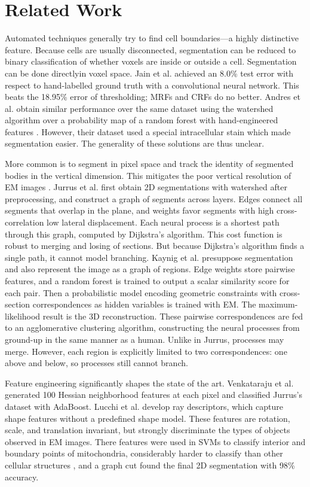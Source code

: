 \documentclass[english]{article}
\newcommand{\+}[1]{\ensuremath{\boldsymbol{\mathrm{#1}}}}
\begin{document}
\section{Related Work}
Automated techniques generally try to find cell boundaries---a highly distinctive feature. Because cells are usually disconnected, segmentation can be reduced to binary classification of whether voxels are inside or outside a cell. Segmentation can be done directlyin voxel space. Jain et al. \cite{Jain2007} achieved an 8.0\% test error with respect to hand-labelled ground truth with a convolutional neural network. This beats the 18.95\% error of thresholding; MRFs and CRFs do no better. Andres et al. obtain similar performance over the same dataset using the watershed algorithm over a probability map of a random forest with hand-engineered features \cite{Andres2008}. However, their dataset used a special intracellular stain which made segmentation easier. The generality of these solutions are thus unclear.

More common is to segment in pixel space and track the identity of segmented bodies in the vertical dimension. This mitigates the poor vertical resolution of EM images \cite{Kaynig2010, Briggman2006}. Jurrus et al. \cite{Jurrus2008} first obtain 2D segmentations with watershed after preprocessing, and construct a graph of segments across layers. Edges connect all segments that overlap in the plane, and weights favor segments with high cross-correlation low lateral displacement. Each neural process is a shortest path through this graph, computed by Dijkstra's algorithm. This cost function is robust to merging and losing of sections. But because Dijkstra's algorithm finds a single path, it cannot model branching. Kaynig et al. \cite{Kaynig2010a} presuppose segmentation and also represent the image as a graph of regions. Edge weights store pairwise features, and a random forest is trained to output a scalar similarity score for each pair. Then a probabilistic model encoding geometric constraints with cross-section correspondences as hidden variables is trained with EM. The maximum-likelihood result is the 3D reconstruction. These pairwise correspondences are fed to an agglomerative clustering algorithm, constructing the neural processes from ground-up in the same manner as a human. Unlike in Jurrus, processes may merge. However, each region is explicitly limited to two correspondences: one above and below, so processes still cannot branch.

Feature engineering significantly shapes the state of the art. Venkataraju et al. \cite{Venkataraju2009} generated 100 Hessian neighborhood features at each pixel and classified Jurrus's dataset with AdaBoost. Lucchi et al. \cite{Lucchi2010} develop ray descriptors, which capture shape features without a predefined shape model. These features are rotation, scale, and translation invariant, but strongly discriminate the types of objects observed in EM images. There features were used in SVMs to classify interior and boundary points of mitochondria, considerably harder to classify than other cellular structures \cite{Kaynig2010b}, and a graph cut found the final 2D segmentation with 98\% accuracy.
\end{document}
